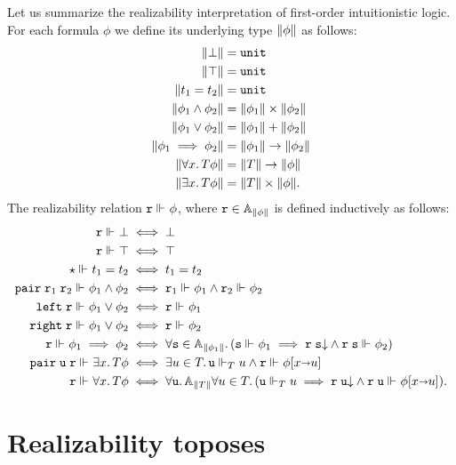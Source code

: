 Let us summarize the realizability interpretation of first-order
intuitionistic logic. For each formula $\phi$ we define its underlying
type $\T{\phi}$ as follows:
%
\begin{align*}
  \T{\bot} &= \unit \\
  \T{\top} &= \unit \\
  \T{t_1 = t_2} &= \unit \\
  \T{\phi_1 \land \phi_2} &= \T{\phi_1} \times \T{\phi_2}\\
  \T{\phi_1 \lor \phi_2} &= \T{\phi_1} + \T{\phi_2}\\
  \T{\phi_1 \implies \phi_2} &= \T{\phi_1} \to \T{\phi_2}\\
  \T{\all{x}{\asm{T}}{\phi}} &= \T{T} \to \T{\phi} \\
  \T{\some{x}{\asm{T}}{\phi}} &= \T{T} \times \T{\phi}.
\end{align*}
%
The realizability relation $\R{r} \rz \phi$, where $\R{r} \in
\Atyp{\T{\phi}}$ is defined inductively as follows:
%
\begin{align*}
  \R{r} \rz \bot &\iff \bot\\
  \R{r} \rz \top &\iff \top\\
  \ttunit \rz t_1 = t_2 &\iff t_1 = t_2\\
  \combPair\;\R{r}_1\;\R{r}_2 \rz \phi_1 \land \phi_2 &\iff
  \R{r}_1 \rz \phi_1 \land \R{r}_2 \rz \phi_2\\
  \combLeft\;\R{r} \rz \phi_1 \lor \phi_2 &\iff \R{r} \rz \phi_1\\
  \combRight\;\R{r} \rz \phi_1 \lor \phi_2 &\iff \R{r} \rz \phi_2\\
  \R{r} \rz \phi_1 \implies \phi_2 &\iff
  \all{\R{s} \in \Atyp{\T{\phi_1}}} (\R{s} \rz \phi_1 \implies
    \defined{\R{r}\;\R{s}} \land \R{r}\;\R{s} \rz \phi_2)
  \\
  \combPair\;\R{u}\;\R{r} \rz \some{x}{\asm{T}}{\phi} &\iff
  \some{u \in T} \R{u} \rz[T] u \land \R{r} \rz \subst{\phi}{x \subto u}
  \\
  \R{r} \rz \all{x}{\asm{T}}{\phi} &\iff
  \all{\R{u}}{\Atyp{\T{T}}}{
    \all{u \in T}
      (\R{u} \rz[T] u \implies
      \defined{\R{r}\;\R{u}} \land \R{r}\;\R{u} \rz \subst{\phi}{x \subto u})
    }.
\end{align*}
%

\section{Realizability toposes}
\label{sec:realizability-toposes}


